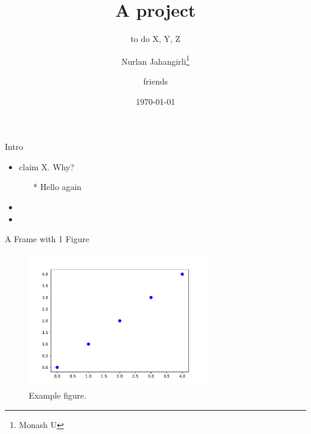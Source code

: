 \documentclass[10pt]{beamer}
\title{A project}
\subtitle{to do X, Y, Z}
\author{Nurlan Jahangirli\thanks{Monash U \njahangirliEmail} \\\and friends}
\date{\today}
\begin{document}
\begin{frame}
\maketitle
\end{frame}


\begin{frame}{Intro}

\begin{itemize} 
	\item  \citet{rajan1998financial} claim X. Why?
	\begin{itemize}
		\item[*]  Hello again
	\end{itemize}
	\item 
	\item 
\end{itemize}

\end{frame}





\begin{frame}[label=main]{A Frame with 1 Figure}


\begin{figure}[H]
\includegraphics[width=0.7\textwidth]{figures/chart.pdf}
\caption{Example figure. \label{fig:example}}
\end{figure}	
\hyperlink{supplemental}{}

\end{frame}
\end{document}
